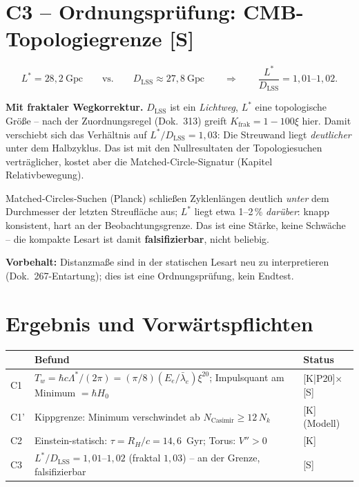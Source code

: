 \documentclass[11pt]{report}
\begin{document}
\section{C3 -- Ordnungsprüfung: CMB-Topologiegrenze [S]}

\begin{equation}
  L^{*} = 28{,}2~\text{Gpc}
  \qquad\text{vs.}\qquad
  D_\text{LSS} \approx 27{,}8~\text{Gpc}
  \qquad\Rightarrow\qquad
  \frac{L^{*}}{D_\text{LSS}} = 1{,}01\text{--}1{,}02.
\end{equation}

\textbf{Mit fraktaler Wegkorrektur.} $D_\text{LSS}$ ist ein
\emph{Lichtweg}, $L^{*}$ eine topologische Größe -- nach der
Zuordnungsregel (Dok.~313) greift $K_\text{frak} = 1-100\xi$
hier. Damit verschiebt sich das Verhältnis auf
$L^{*}/D_\text{LSS} = 1{,}03$: Die Streuwand liegt
\emph{deutlicher} unter dem Halbzyklus. Das ist mit den
Nullresultaten der Topologiesuchen verträglicher, kostet aber die
Matched-Circle-Signatur (Kapitel Relativbewegung).

Matched-Circles-Suchen (Planck) schließen Zyklenlängen deutlich
\emph{unter} dem Durchmesser der letzten Streufläche aus; $L^{*}$
liegt etwa 1--2\,\% \emph{darüber}: knapp konsistent, hart an der
Beobachtungsgrenze. Das ist eine Stärke, keine Schwäche -- die
kompakte Lesart ist damit \textbf{falsifizierbar}, nicht beliebig.

\textbf{Vorbehalt:} Distanzmaße sind in der statischen Lesart neu zu
interpretieren (Dok.~267-Entartung); dies ist eine Ordnungsprüfung,
kein Endtest.

\section{Ergebnis und Vorwärtspflichten}

\begin{center}
\begin{tabular}{lp{7.2cm}l}
\toprule
& Befund & Status \\
\midrule
C1 & $T_w = \hbar c\Lambda^{*}/(2\pi) = (\pi/8)(E_e/\bar\lambda_e)\xi^{20}$;
     Impulsquant am Minimum $= \hbar H_0$ & [K|P20]$\times$[S] \\
C1' & Kippgrenze: Minimum verschwindet ab
     $N_\text{Casimir} \ge 12\,N_k$ & [K] (Modell) \\
C2 & Einstein-statisch: $\tau = R_H/c = 14{,}6$~Gyr;
     Torus: $V'' > 0$ & [K] \\
C3 & $L^{*}/D_\text{LSS} = 1{,}01$--$1{,}02$ (fraktal $1{,}03$) -- an der Grenze,
     falsifizierbar & [S] \\
\bottomrule
\end{tabular}
\end{center}
\end{document}
